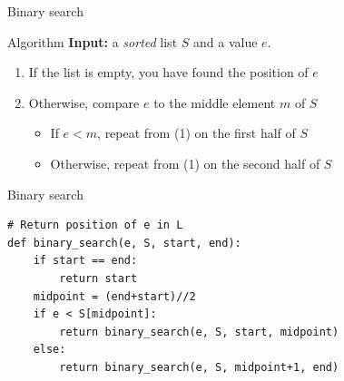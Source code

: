 \documentclass[11pt]{beamer}
\begin{document}
\begin{frame}{Binary search}
	\begin{block}{Algorithm}
		\textbf{Input:} a \emph{sorted} list $S$ and a value $e$.
		\begin{enumerate}
			\item If the list is empty, you have found the position of $e$
			\item Otherwise, compare $e$ to the middle element $m$ of $S$
			\begin{itemize}
				\item If $e<m$, repeat from (1) on the first half of $S$
				\item Otherwise, repeat from (1) on the second half of $S$
			\end{itemize}
		\end{enumerate}
	\end{block}
\end{frame}

\begin{frame}[fragile]{Binary search}
\begin{lstlisting}
# Return position of e in L
def binary_search(e, S, start, end):
	if start == end:
		return start
	midpoint = (end+start)//2
	if e < S[midpoint]:
		return binary_search(e, S, start, midpoint)
	else:
		return binary_search(e, S, midpoint+1, end)
\end{lstlisting}
\end{frame}
\end{document}
